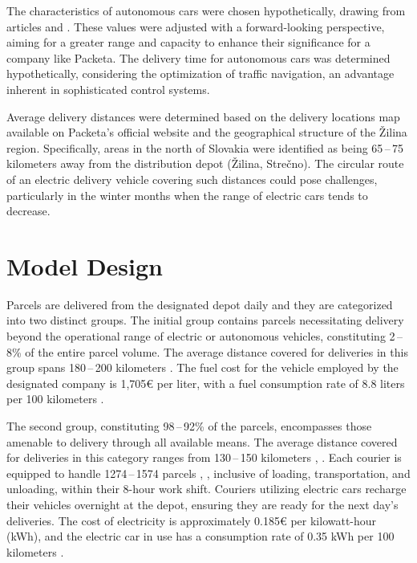 \documentclass[a4paper, 11pt, a4paper]{article}
\begin{document}
The characteristics of autonomous cars were chosen hypothetically, drawing from articles \cite{autonomous.emissions} and \cite{autonomous.models}. These values were adjusted with a
forward-looking perspective, aiming for a greater range and capacity to enhance their significance for a company like Packeta. The delivery
time for autonomous cars was determined hypothetically, considering the optimization of traffic navigation, an advantage inherent in sophisticated
control systems.

Average delivery distances were determined based on the delivery locations map available on Packeta's official website \cite{packeta} and the geographical
structure of the Žilina region. Specifically, areas in the north of Slovakia were identified as being 65\,--\,75 kilometers away from the
distribution depot (Žilina, Strečno). The circular route of an electric delivery vehicle covering such distances could pose challenges,
particularly in the winter months when the range of electric cars tends to decrease.


\section{Model Design}

Parcels are delivered from the designated depot daily and they are categorized into two distinct groups. The initial group contains parcels 
necessitating delivery beyond the operational range of electric or autonomous vehicles, constituting 2\,--\,8\% \cite{packeta} of the entire parcel volume. 
The average distance covered for deliveries in this group spans 180\,--\,200 kilometers \cite{packeta}. The fuel cost for the vehicle employed by the designated 
company is 1,705€ per liter, with a fuel consumption rate of 8.8 liters per 100 kilometers \cite{peugeot}.

The second group, constituting 98\,--\,92\% \cite{packeta} of the parcels, encompasses those amenable to delivery through all available means. The average distance
covered for deliveries in this category ranges from 130\,--\,150 kilometers \cite{packeta}, \cite{delivery.distance}. Each courier is equipped to handle 1274\,--\,1574 parcels \cite{parcels.num}, \cite{delivery.percentage}, inclusive of loading,
transportation, and unloading, within their 8-hour work shift. Couriers utilizing electric cars recharge their vehicles overnight at the depot, ensuring
they are ready for the next day's deliveries. The cost of electricity is approximately 0.185€ per kilowatt-hour (kWh), and the electric car in use has a
consumption rate of 0.35 kWh per 100 kilometers \cite{peugeot}.
\end{document}
